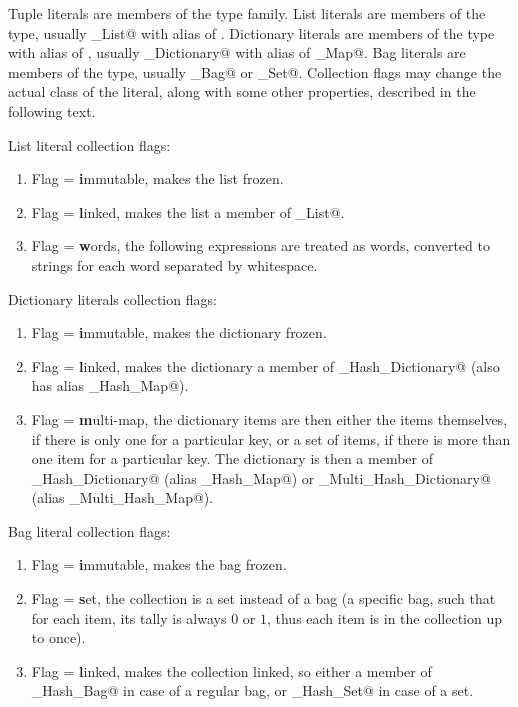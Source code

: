 Tuple literals are members of the \lstinline@Tuple@ type family. List literals are members of the \lstinline@List@ type, usually \lstinline@Array_List@ with alias of \lstinline@Array@. Dictionary literals are members of the \lstinline@Dictionary@ type with alias of \lstinline@Map@, usually \lstinline@Hash_Dictionary@ with alias of \lstinline@Hash_Map@. Bag literals are members of the \lstinline@Bag@ type, usually \lstinline@Hash_Bag@ or \lstinline@Hash_Set@. Collection flags may change the actual class of the literal, along with some other properties, described in the following text. 

List literal collection flags: 

\begin{enumerate}
\item Flag \lstinline@i@ = \textbf{i}mmutable, makes the list frozen. 
\item Flag \lstinline@l@ = \textbf{l}inked, makes the list a member of \lstinline@Linked_List@. 
\item Flag \lstinline@w@ = \textbf{w}ords, the following expressions are treated as words, converted to strings for each word separated by whitespace. 
\end{enumerate}

Dictionary literals collection flags:


\begin{enumerate}
\item Flag \lstinline@i@ = \textbf{i}mmutable, makes the dictionary frozen. 
\item Flag \lstinline@l@ = \textbf{l}inked, makes the dictionary a member of \lstinline@Linked_Hash_Dictionary@ (also has alias \lstinline@Linked_Hash_Map@).
\item Flag \lstinline@m@ = \textbf{m}ulti-map, the dictionary items are then either the items themselves, if there is only one for a particular key, or a set of items, if there is more than one item for a particular key. The dictionary is then a member of \lstinline@Multi_Hash_Dictionary@ (alias \lstinline@Multi_Hash_Map@) or \lstinline@Linked_Multi_Hash_Dictionary@ (alias \lstinline@Linked_Multi_Hash_Map@). 
\end{enumerate}

Bag literal collection flags:

\begin{enumerate}
\item Flag \lstinline@i@ = \textbf{i}mmutable, makes the bag frozen. 
\item Flag \lstinline@s@ = \textbf{s}et, the collection is a set instead of a bag (a specific bag, such that for each item, its tally is always $0$ or $1$, thus each item is in the collection up to once). 
\item Flag \lstinline@l@ = \textbf{l}inked, makes the collection linked, so either a member of \lstinline@Linked_Hash_Bag@ in case of a regular bag, or \lstinline@Linked_Hash_Set@ in case of a set. 
\end{enumerate}

